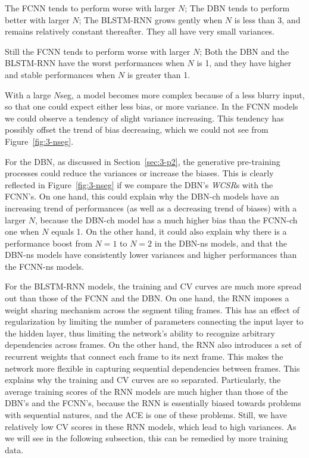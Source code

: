 The FCNN tends to perform worse with larger $N$; The DBN tends to perform better with larger $N$; The BLSTM-RNN grows gently when $N$ is less than 3, and remains relatively constant thereafter. They all have very small variances.

Still the FCNN tends to perform worse with larger $N$; Both the DBN and the BLSTM-RNN have the worst performances when $N$ is 1, and they have higher and stable performances when $N$ is greater than 1.

With a large $N$seg, a model becomes more complex because of a less blurry input, so that one could expect either less bias, or more variance. In the FCNN models we could observe a tendency of slight variance increasing. This tendency has possibly offset the trend of bias decreasing, which we could not see from Figure~\ref{fig:3-nseg}.

For the DBN, as discussed in Section~\ref{sec:3-p2}, the generative pre-training processes could reduce the variances or increase the biases. This is clearly reflected in Figure~\ref{fig:3-nseg} if we compare the DBN's \textit{WCSR}s with the FCNN's. On one hand, this could explain why the DBN-ch models have an increasing trend of performances (as well as a decreasing trend of biases) with a larger $N$, because the DBN-ch model has a much higher bias than the FCNN-ch one when $N$ equals 1. On the other hand, it could also explain why there is a performance boost from $N=1$ to $N=2$ in the DBN-ns models, and that the DBN-ns models have consistently lower variances and higher performances than the FCNN-ns models.

For the BLSTM-RNN models, the training and CV curves are much more spread out than those of the FCNN and the DBN. On one hand, the RNN imposes a weight sharing mechanism across the segment tiling frames. This has an effect of regularization by limiting the number of parameters connecting the input layer to the hidden layer, thus limiting the network's ability to recognize arbitrary dependencies across frames. On the other hand, the RNN also introduces a set of recurrent weights that connect each frame to its next frame. This makes the network more flexible in capturing sequential dependencies between frames. This explains why the training and CV curves are so separated. Particularly, the average training scores of the RNN models are much higher than those of the DBN's and the FCNN's, because the RNN is essentially biased towards problems with sequential natures, and the ACE is one of these problems. Still, we have relatively low CV scores in these RNN models, which lead to high variances. As we will see in the following subsection, this can be remedied by more training data.

